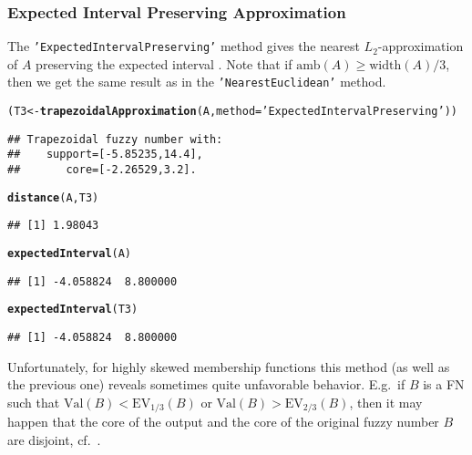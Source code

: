 \documentclass[11pt]{article}\usepackage{graphicx, color}
\makeatletter
\newcommand{\hlfunctioncall}[1]{\textcolor[rgb]{0.501960784313725,0,0.329411764705882}{\textbf{#1}}}%
\newcommand{\hlstring}[1]{\textcolor[rgb]{0.6,0.6,1}{#1}}%
\newenvironment{kframe}{%
 \def\at@end@of@kframe{}%
 \ifinner\ifhmode%
  \def\at@end@of@kframe{\end{minipage}}%
  \begin{minipage}{\columnwidth}%
 \fi\fi%
 \def\FrameCommand##1{\hskip\@totalleftmargin \hskip-\fboxsep
 \colorbox{shadecolor}{##1}\hskip-\fboxsep
     \hskip-\linewidth \hskip-\@totalleftmargin \hskip\columnwidth}%
 \MakeFramed {\advance\hsize-\width
   \@totalleftmargin\z@ \linewidth\hsize
   \@setminipage}}%
 {\par\unskip\endMakeFramed%
 \at@end@of@kframe}
\newenvironment{knitrout}{}{} %
\makeatother
\begin{document}
\subsubsection{Expected Interval Preserving Approximation}


The \texttt{'ExpectedIntervalPreserving'} method
gives the nearest $L_2$-approximation of $A$
preserving the expected interval \cite{Ban2008:approxpresexpint,Grzegorzewski2010:trapfnapproxexpint,Yeh2008:traptriapprox}.
Note that if $\mathrm{amb}(A) \ge \mathrm{width}(A)/3$, then
we get the same result as in
the \texttt{'NearestEuclidean'} method.


\begin{knitrout}\small
{}\color{fgcolor}\begin{kframe}
\begin{alltt}
(T3 <- \hlfunctioncall{trapezoidalApproximation}(A, method=\hlstring{'ExpectedIntervalPreserving'}))
\end{alltt}
\begin{verbatim}
## Trapezoidal fuzzy number with:
##    support=[-5.85235,14.4],
##       core=[-2.26529,3.2].
\end{verbatim}
\begin{alltt}
\hlfunctioncall{distance}(A, T3)
\end{alltt}
\begin{verbatim}
## [1] 1.98043
\end{verbatim}
\begin{alltt}
\hlfunctioncall{expectedInterval}(A)
\end{alltt}
\begin{verbatim}
## [1] -4.058824  8.800000
\end{verbatim}
\begin{alltt}
\hlfunctioncall{expectedInterval}(T3)
\end{alltt}
\begin{verbatim}
## [1] -4.058824  8.800000
\end{verbatim}
\end{kframe}
\end{knitrout}





Unfortunately, for highly skewed membership functions this method
(as well as the previous one) reveals sometimes quite unfavorable
behavior. E.g.~if $B$ is a FN such that
$\mathrm{Val}(B) < \mathrm{EV}_{1/3}(B)$
or $\mathrm{Val}(B) > \mathrm{EV}_{2/3}(B)$,
then it may happen that the core of the output
and the core of the original fuzzy number $B$ are disjoint,
cf.~\cite{GrzegorzewskiPasternak2011:trapapproxsupcore}.
\end{document}
